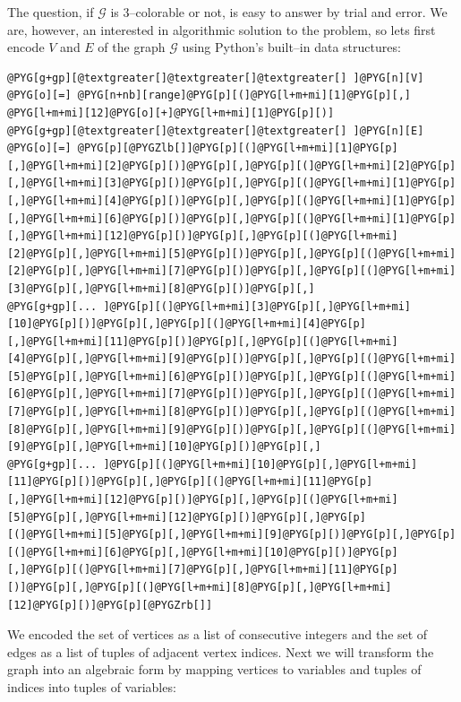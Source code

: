 The question, if $\mathcal{G}$ is $3$--colorable or not, is easy to answer by trial and error. We
are, however, an interested in algorithmic solution to the problem, so lets first encode $V$ and
$E$ of the graph $\mathcal{G}$ using Python's built--in data structures:

\begin{Verbatim}[commandchars=@\[\]]
@PYG[g+gp][@textgreater[]@textgreater[]@textgreater[] ]@PYG[n][V] @PYG[o][=] @PYG[n+nb][range]@PYG[p][(]@PYG[l+m+mi][1]@PYG[p][,] @PYG[l+m+mi][12]@PYG[o][+]@PYG[l+m+mi][1]@PYG[p][)]
@PYG[g+gp][@textgreater[]@textgreater[]@textgreater[] ]@PYG[n][E] @PYG[o][=] @PYG[p][@PYGZlb[]]@PYG[p][(]@PYG[l+m+mi][1]@PYG[p][,]@PYG[l+m+mi][2]@PYG[p][)]@PYG[p][,]@PYG[p][(]@PYG[l+m+mi][2]@PYG[p][,]@PYG[l+m+mi][3]@PYG[p][)]@PYG[p][,]@PYG[p][(]@PYG[l+m+mi][1]@PYG[p][,]@PYG[l+m+mi][4]@PYG[p][)]@PYG[p][,]@PYG[p][(]@PYG[l+m+mi][1]@PYG[p][,]@PYG[l+m+mi][6]@PYG[p][)]@PYG[p][,]@PYG[p][(]@PYG[l+m+mi][1]@PYG[p][,]@PYG[l+m+mi][12]@PYG[p][)]@PYG[p][,]@PYG[p][(]@PYG[l+m+mi][2]@PYG[p][,]@PYG[l+m+mi][5]@PYG[p][)]@PYG[p][,]@PYG[p][(]@PYG[l+m+mi][2]@PYG[p][,]@PYG[l+m+mi][7]@PYG[p][)]@PYG[p][,]@PYG[p][(]@PYG[l+m+mi][3]@PYG[p][,]@PYG[l+m+mi][8]@PYG[p][)]@PYG[p][,]
@PYG[g+gp][... ]@PYG[p][(]@PYG[l+m+mi][3]@PYG[p][,]@PYG[l+m+mi][10]@PYG[p][)]@PYG[p][,]@PYG[p][(]@PYG[l+m+mi][4]@PYG[p][,]@PYG[l+m+mi][11]@PYG[p][)]@PYG[p][,]@PYG[p][(]@PYG[l+m+mi][4]@PYG[p][,]@PYG[l+m+mi][9]@PYG[p][)]@PYG[p][,]@PYG[p][(]@PYG[l+m+mi][5]@PYG[p][,]@PYG[l+m+mi][6]@PYG[p][)]@PYG[p][,]@PYG[p][(]@PYG[l+m+mi][6]@PYG[p][,]@PYG[l+m+mi][7]@PYG[p][)]@PYG[p][,]@PYG[p][(]@PYG[l+m+mi][7]@PYG[p][,]@PYG[l+m+mi][8]@PYG[p][)]@PYG[p][,]@PYG[p][(]@PYG[l+m+mi][8]@PYG[p][,]@PYG[l+m+mi][9]@PYG[p][)]@PYG[p][,]@PYG[p][(]@PYG[l+m+mi][9]@PYG[p][,]@PYG[l+m+mi][10]@PYG[p][)]@PYG[p][,]
@PYG[g+gp][... ]@PYG[p][(]@PYG[l+m+mi][10]@PYG[p][,]@PYG[l+m+mi][11]@PYG[p][)]@PYG[p][,]@PYG[p][(]@PYG[l+m+mi][11]@PYG[p][,]@PYG[l+m+mi][12]@PYG[p][)]@PYG[p][,]@PYG[p][(]@PYG[l+m+mi][5]@PYG[p][,]@PYG[l+m+mi][12]@PYG[p][)]@PYG[p][,]@PYG[p][(]@PYG[l+m+mi][5]@PYG[p][,]@PYG[l+m+mi][9]@PYG[p][)]@PYG[p][,]@PYG[p][(]@PYG[l+m+mi][6]@PYG[p][,]@PYG[l+m+mi][10]@PYG[p][)]@PYG[p][,]@PYG[p][(]@PYG[l+m+mi][7]@PYG[p][,]@PYG[l+m+mi][11]@PYG[p][)]@PYG[p][,]@PYG[p][(]@PYG[l+m+mi][8]@PYG[p][,]@PYG[l+m+mi][12]@PYG[p][)]@PYG[p][@PYGZrb[]]
\end{Verbatim}
\noindent
We encoded the set of vertices as a list of consecutive integers and the set of edges as a list
of tuples of adjacent vertex indices. Next we will transform the graph into an algebraic form by
mapping vertices to variables and tuples of indices into tuples of variables:

